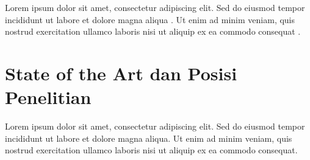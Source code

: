 Lorem ipsum dolor sit amet, consectetur adipiscing elit. Sed do eiusmod tempor incididunt ut labore et dolore magna aliqua \citep{referensi2}. Ut enim ad minim veniam, quis nostrud exercitation ullamco laboris nisi ut aliquip ex ea commodo consequat \citep{referensi3}.

\section{State of the Art dan Posisi Penelitian}


Lorem ipsum dolor sit amet, consectetur adipiscing elit. Sed do eiusmod tempor incididunt ut labore et dolore magna aliqua. Ut enim ad minim veniam, quis nostrud exercitation ullamco laboris nisi ut aliquip ex ea commodo consequat.
